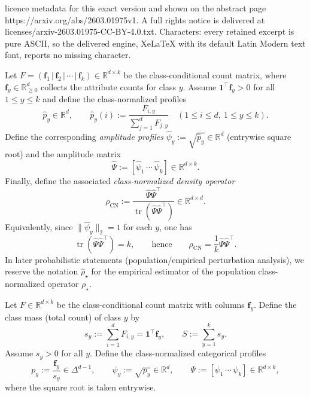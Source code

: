 \documentclass[10pt,a4paper]{amsart}
\newcommand{\R}{\mathbb{R}}
\newcommand{\tr}{\operatorname{tr}}
\begin{document}
licence metadata for this exact version and shown on the abstract page https://arxiv.org/abs/2603.01975v1. A full rights notice is delivered at licenses/arxiv-2603.01975-CC-BY-4.0.txt. Characters: every retained excerpt is pure ASCII, so the delivered engine, XeLaTeX with its default Latin Modern text font, reports no missing character.
\begin{Definition}
\label{def:class_normalized_profiles}
Let $F=(\mathbf f_1\,|\,\mathbf f_2\,|\,\cdots\,|\,\mathbf f_k)\in\R^{d\times k}$ be the class-conditional count matrix, where
$\mathbf f_y\in\R_{\ge 0}^d$ collects the attribute counts for class $y$.
Assume $\mathbf 1^\top \mathbf f_y>0$ for all $1\le y\le k$ and define the class-normalized profiles
\[
\widehat p_y \in \R^d,\qquad
\widehat p_y(i):=\frac{F_{i,y}}{\sum_{j=1}^d F_{j,y}}
\quad (1\le i\le d,\ 1\le y\le k).
\]
Define the corresponding \emph{amplitude profiles} $\widehat\psi_y:=\sqrt{\widehat p_y}\in\R^d$ (entrywise square root) and the
amplitude matrix
\[
\widehat\Psi := [\widehat\psi_1\,\cdots\,\widehat\psi_k]\in\R^{d\times k}.
\]
Finally, define the associated \emph{class-normalized density operator}
\[
\rho_{\mathrm{CN}}
:= \frac{\widehat\Psi\widehat\Psi^\top}{\tr(\widehat\Psi\widehat\Psi^\top)}
\in\R^{d\times d}.
\]
Equivalently, since $\|\widehat\psi_y\|_2=1$ for each $y$, one has
\[
\tr(\widehat\Psi\widehat\Psi^\top)=k,
\qquad\text{hence}\qquad
\rho_{\mathrm{CN}}=\frac{1}{k}\widehat\Psi\widehat\Psi^\top.
\]
In later probabilistic statements (population/empirical perturbation analysis), we reserve the notation
$\widehat\rho_\star$ for the empirical estimator of the population class-normalized operator $\rho_\star$.
\end{Definition}

\begin{Notation}
\label{not:class_masses_profiles}
Let $F\in\R^{d\times k}$ be the class-conditional count matrix with columns $\mathbf f_y$.
Define the class mass (total count) of class $y$ by
\[
s_y := \sum_{i=1}^d F_{i,y} = \mathbf 1^\top \mathbf f_y,
\qquad
S := \sum_{y=1}^k s_y.
\]
Assume $s_y>0$ for all $y$.
Define the class-normalized categorical profiles
\[
p_y := \frac{\mathbf f_y}{s_y}\in\Delta^{d-1},
\qquad
\psi_y := \sqrt{p_y}\in\R^d,
\qquad
\Psi := [\psi_1\,\cdots\,\psi_k]\in\R^{d\times k},
\]
where the square root is taken entrywise.
\end{Notation}
\end{document}
